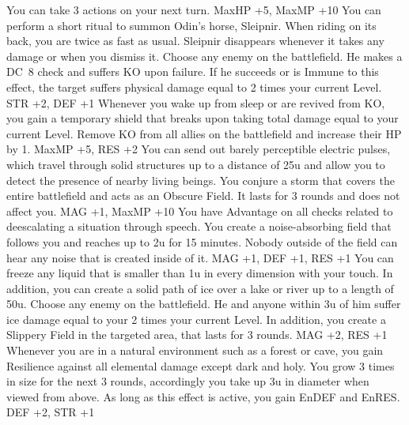 {You can take 3 actions on your next turn.}
{MaxHP +5, MaxMP +10}
%
\clearpage
%
{You can perform a short ritual to summon Odin's horse, Sleipnir. When riding on its back, you are twice as fast as usual. Sleipnir disappears whenever it takes any damage or when you dismiss it.}
{Choose any enemy on the battlefield. He makes a DC~8 check and suffers KO upon failure. If he succeeds or is Immune to this effect, the target suffers physical damage equal to 2 times your current Level.}
{STR +2, DEF +1}
%
\vfill
%
{Whenever you wake up from sleep or are revived from KO, you gain a temporary shield that breaks upon taking total damage equal to your current Level.}
{Remove KO from all allies on the battlefield and increase their HP by 1.}
{MaxMP +5, RES +2}
%
\vfill
%
{You can send out barely perceptible electric pulses, which travel through solid structures up to a distance of 25u and allow you to detect the presence of nearby living beings.}
{You conjure a storm  that covers the entire battlefield and acts as an Obscure Field. It lasts for 3 rounds and does not affect you.}
{MAG +1, MaxMP +10}
%
\vfill
%
{You have Advantage on all checks related to deescalating a situation through speech.}
{You create a noise-absorbing field that follows you and reaches up to 2u for 15 minutes. Nobody outside of the field can hear any noise that is created inside of it.}
{MAG +1, DEF +1, RES +1}
%
\vfill
%
{You can freeze any liquid that is smaller than 1u in every dimension with your touch. In addition, you can create a solid path of ice over a lake or river up to a length of 50u.}
{Choose any enemy on the battlefield. He and anyone within 3u of him suffer ice damage equal to your 2 times your current Level. In addition, you create a Slippery Field in the targeted area, that lasts for 3 rounds.}
{MAG +2, RES +1}
%
\vfill
%
{Whenever you are in a natural environment such as a forest or cave, you gain Resilience against all elemental damage except dark and holy.}
{You grow 3 times in size for the next 3 rounds, accordingly you take up 3u in diameter when viewed from above. As long as this effect is active, you gain EnDEF and EnRES.}
{DEF +2, STR +1}
%
\clearpage